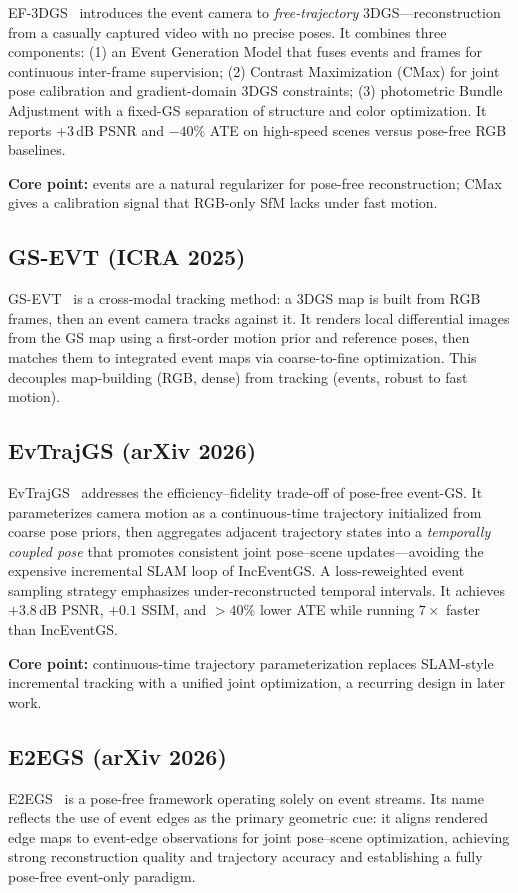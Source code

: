 EF-3DGS~\cite{liao2025ef3dgs} introduces the event camera to \emph{free-trajectory} 3DGS---reconstruction from a casually captured video with no precise poses. It combines three components: (1) an Event Generation Model that fuses events and frames for continuous inter-frame supervision; (2) Contrast Maximization (CMax) for joint pose calibration and gradient-domain 3DGS constraints; (3) photometric Bundle Adjustment with a fixed-GS separation of structure and color optimization. It reports $+3$\,dB PSNR and $-40\%$ ATE on high-speed scenes versus pose-free RGB baselines.

\textbf{Core point:} events are a natural regularizer for pose-free reconstruction; CMax gives a calibration signal that RGB-only SfM lacks under fast motion.

\subsection{GS-EVT (ICRA 2025)}
\label{sec:static:gsevt}

GS-EVT~\cite{liu2025gsevt} is a cross-modal tracking method: a 3DGS map is built from RGB frames, then an event camera tracks against it. It renders local differential images from the GS map using a first-order motion prior and reference poses, then matches them to integrated event maps via coarse-to-fine optimization. This decouples map-building (RGB, dense) from tracking (events, robust to fast motion).

\subsection{EvTrajGS (arXiv 2026)}
\label{sec:static:evtrajgs}

EvTrajGS~\cite{chen2026evtrajgs} addresses the efficiency--fidelity trade-off of pose-free event-GS. It parameterizes camera motion as a continuous-time trajectory initialized from coarse pose priors, then aggregates adjacent trajectory states into a \emph{temporally coupled pose} that promotes consistent joint pose--scene updates---avoiding the expensive incremental SLAM loop of IncEventGS. A loss-reweighted event sampling strategy emphasizes under-reconstructed temporal intervals. It achieves $+3.8$\,dB PSNR, $+0.1$ SSIM, and $>40\%$ lower ATE while running $7\times$ faster than IncEventGS.

\textbf{Core point:} continuous-time trajectory parameterization replaces SLAM-style incremental tracking with a unified joint optimization, a recurring design in later work.

\subsection{E2EGS (arXiv 2026)}
\label{sec:static:e2egs}

E2EGS~\cite{kim2026e2egs} is a pose-free framework operating solely on event streams. Its name reflects the use of event edges as the primary geometric cue: it aligns rendered edge maps to event-edge observations for joint pose--scene optimization, achieving strong reconstruction quality and trajectory accuracy and establishing a fully pose-free event-only paradigm.
